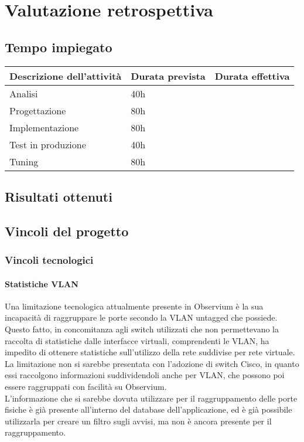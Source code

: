 \documentclass[Tesi.tex]{subfiles}
\begin{document}
\chapter{Valutazione retrospettiva}

\section{Tempo impiegato}
\begin{longtable}{|p{6cm}|p{3.5cm}|p{3.5cm}|}
	\hline
	{\bf Descrizione dell'attività} & {\bf Durata prevista} & {\bf Durata effettiva} \\
	\hline
	Analisi & 40h & \\
	\hline
	Progettazione & 80h & \\
	\hline
	Implementazione & 80h & \\
	\hline
	Test in produzione & 40h & \\
	\hline
	Tuning & 80h & \\
	\hline
	
\end{longtable}

\section{Risultati ottenuti}

\section{Vincoli del progetto}
\subsection{Vincoli tecnologici}
\subsubsection{Statistiche VLAN}
Una limitazione tecnologica attualmente presente in Observium è la sua incapacità di raggruppare le porte secondo la VLAN untagged che possiede. \\
Questo fatto, in concomitanza agli switch utilizzati che non permettevano la raccolta di statistiche dalle interfacce virtuali, comprendenti le VLAN, ha impedito di ottenere statistiche sull'utilizzo della rete suddivise per rete virtuale. \\
La limitazione non si sarebbe presentata con l'adozione di switch Cisco, in quanto essi raccolgono informazioni suddividendoli anche per VLAN, che possono poi essere raggruppati con facilità su Observium. \\
L'informazione che si sarebbe dovuta utilizzare per il raggruppamento delle porte fisiche è già presente all'interno del database dell'applicazione, ed è già possibile utilizzarla per creare un filtro sugli avvisi, ma non è ancora presente per il raggruppamento.
\end{document}
